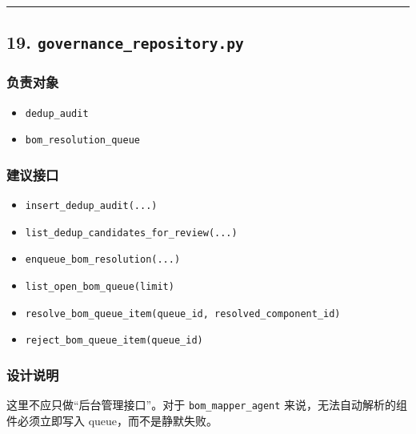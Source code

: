 \documentclass[UTF8]{ctexart}
\providecommand{\tightlist}{%
  \setlength{\itemsep}{0pt}\setlength{\parskip}{0pt}}
\begin{document}
\begin{center}\rule{0.5\linewidth}{0.5pt}\end{center}

\hypertarget{governance_repository.py}{%
\subsection{\texorpdfstring{19.
\texttt{governance\_repository.py}}{19. governance\_repository.py}}\label{governance_repository.py}}

\hypertarget{ux8d1fux8d23ux5bf9ux8c61-3}{%
\subsubsection{负责对象}\label{ux8d1fux8d23ux5bf9ux8c61-3}}

\begin{itemize}
\tightlist
\item
  \texttt{dedup\_audit}
\item
  \texttt{bom\_resolution\_queue}
\end{itemize}

\hypertarget{ux5efaux8baeux63a5ux53e3-3}{%
\subsubsection{建议接口}\label{ux5efaux8baeux63a5ux53e3-3}}

\begin{itemize}
\tightlist
\item
  \texttt{insert\_dedup\_audit(...)}
\item
  \texttt{list\_dedup\_candidates\_for\_review(...)}
\item
  \texttt{enqueue\_bom\_resolution(...)}
\item
  \texttt{list\_open\_bom\_queue(limit)}
\item
  \texttt{resolve\_bom\_queue\_item(queue\_id,\ resolved\_component\_id)}
\item
  \texttt{reject\_bom\_queue\_item(queue\_id)}
\end{itemize}

\hypertarget{ux8bbeux8ba1ux8bf4ux660e-2}{%
\subsubsection{设计说明}\label{ux8bbeux8ba1ux8bf4ux660e-2}}

这里不应只做``后台管理接口''。对于 \texttt{bom\_mapper\_agent}
来说，无法自动解析的组件必须立即写入 queue，而不是静默失败。
\end{document}

